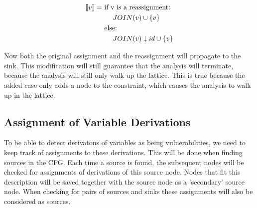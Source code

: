 \begin{align*}
  \llbracket v \rrbracket = &\text{ if v is a reassignment:}\\
  &\phantom{==}JOIN(v) \cup \{ v \}\\
  &\text{ else:}\\
  &\phantom{==}JOIN(v) \downarrow id \cup \{ v \}\\
\end{align*}

Now both the original assignment and the reassignment will propagate to the sink.
This modification will still guarantee that the analysis will terminate, because the analysis will still only walk up the lattice.
This is true because the added case only adds a node to the constraint, which causes the analysis to walk up in the lattice.

\subsection{Assignment of Variable Derivations}\label{ext:derivation}
To be able to detect derivatons of variables as being vulnerabilities, we need to keep track of assignments to these derivations.
This will be done when finding sources in the CFG.
Each time a source is found, the subsequent nodes will be checked for assignments of derivations of this source node.
Nodes that fit this description will be saved together with the source node as a 'secondary' source node.
When checking for pairs of sources and sinks these assignments will also be considered as sources.
